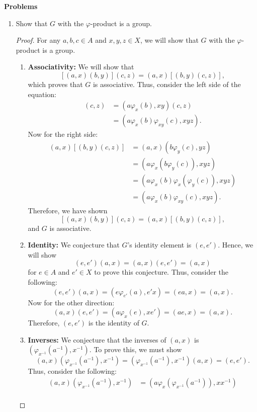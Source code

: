 \documentclass[12pt, oneside]{book}
\newcommand{\pf}[1]{
    \begin{customframedproof}[linecolor=orangehdx!75]
        \begin{proof}
        #1
        \end{proof}
    \end{customframedproof}
}
\begin{document}
\textbf{Problems}
\begin{enumerate}
    \item Show that \(G\) with the \(\varphi\)-product is a group.
    \pf{ 
        For any \(a,b,c \in A\) and \(x,y,z \in X\), we will show that \(G\) with the \(\varphi\)-product is a group.
    \begin{enumerate}
        \item \textbf{Associativity:} We will show that
        \[
            [(a,x)(b,y)](c,z) = (a,x)[(b,y)(c,z)],
        \]
        which proves that \(G\) is associative. Thus, consider the left side of the equation:
        \begin{align*}
            [(a,x)(b,y)](c,z) &= (a\varphi_{x}(b),xy)(c,z) \\
            &= (a\varphi_{x}(b)\varphi_{xy}(c),xyz).
        \end{align*}
        Now for the right side:
        \begin{align*}
             (a,x)[(b,y)(c,z)] &= (a,x)(b\varphi_{y}(c),yz) \\
             &= (a\varphi_{x}(b\varphi_{y}(c)),xyz) \\
             &= (a\varphi_{x}(b)\varphi_{x}(\varphi_{y}(c)),xyz) \\
             &= (a\varphi_{x}(b)\varphi_{xy}(c),xyz).
        \end{align*}
        Therefore, we have shown
        \[
            [(a,x)(b,y)](c,z) = (a,x)[(b,y)(c,z)],
        \]
        and \(G\) is associative.
        \item \textbf{Identity:} We conjecture that \(G\)'s identity element is \((e,e')\). Hence, we will show 
        \[
            (e,e')(a,x) = (a,x)(e,e') = (a,x)
        \]
        for \(e \in A\) and \(e' \in X\) to prove this conjecture. Thus, consider the following:
        \[
            (e,e')(a,x) = (e\varphi_{e'}(a),e'x) = (ea, x) = (a,x).
        \]
        Now for the other direction:
        \[
            (a,x)(e,e') = (a\varphi_{x}(e),xe') = (ae,x) = (a,x).
        \]
        Therefore, \((e,e')\) is the identity of \(G\).
        \item \textbf{Inverses:} We conjecture that the inverses of \((a,x)\) is \((\varphi_{x^{-1}}(a^{-1}), x^{-1})\). To prove this, we must show 
        \[
            (a,x)(\varphi_{x^{-1}}(a^{-1}), x^{-1}) = (\varphi_{x^{-1}}(a^{-1}), x^{-1})(a,x) = (e,e').
        \]
        Thus, consider the following:
        \begin{align*}
            (a,x)(\varphi_{x^{-1}}(a^{-1}), x^{-1}) &= (a\varphi_{x}\left(\varphi_{x^{-1}}(a^{-1})\right), xx^{-1}) \\

\end{align*}
\end{enumerate}}
\end{enumerate}
\end{document}

